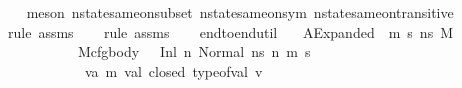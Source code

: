 \begin{isabellebody}
\ \ \isamarkupfalse%
\ {\isacharparenleft}{\kern0pt}meson\ nstate{\isacharunderscore}{\kern0pt}same{\isacharunderscore}{\kern0pt}on{\isacharunderscore}{\kern0pt}subset\ nstate{\isacharunderscore}{\kern0pt}same{\isacharunderscore}{\kern0pt}on{\isacharunderscore}{\kern0pt}sym\ nstate{\isacharunderscore}{\kern0pt}same{\isacharunderscore}{\kern0pt}on{\isacharunderscore}{\kern0pt}transitive{\isacharparenright}{\kern0pt}\isanewline
\ \ \ \isamarkupfalse%
\ {\isacharparenleft}{\kern0pt}rule\ assms{\isacharparenleft}{\kern0pt}{}{\isacharparenright}{\kern0pt}{\isacharparenright}{\kern0pt}\isanewline
\ \ \isamarkupfalse%
\ {\isacharparenleft}{\kern0pt}rule\ assms{\isacharparenleft}{\kern0pt}{}{\isacharparenright}{\kern0pt}{\isacharparenright}{\kern0pt}\isanewline
\ \ \isamarkupfalse%
%
\endisatagproof
{\isafoldproof}%
%
\isadelimproof
%
\endisadelimproof
%
\isadelimdocument
%
\endisadelimdocument
%
\isatagdocument
%
\isamarkuptrue%
%
\endisatagdocument
{\isafolddocument}%
%
\isadelimdocument
%
\endisadelimdocument
{}\isamarkupfalse%
\ end{\isacharunderscore}{\kern0pt}to{\isacharunderscore}{\kern0pt}end{\isacharunderscore}{\kern0pt}util{\isacharcolon}{\kern0pt}\isanewline
\ \ \ AExpanded{\isacharcolon}{\kern0pt}{\isachardoublequoteopen}{\isasymAnd}\ {\isasymGamma}\ m{\isacharprime}{\kern0pt}\ s{\isacharprime}{\kern0pt}\ ns\ M{\isachardot}{\kern0pt}\isanewline
\ \ \ \ \ \ \ \ \ \ \ M{\isacharcomma}{\kern0pt}{\isasymLambda}{\isacharcomma}{\kern0pt}{\isasymGamma}{\isacharcomma}{\kern0pt}{\isacharbrackleft}{\kern0pt}{\isacharbrackright}{\kern0pt}{\isacharcomma}{\kern0pt}cfg{\isacharunderscore}{\kern0pt}body\ \ {\isasymturnstile}\ {\isacharparenleft}{\kern0pt}Inl\ n{\isacharcomma}{\kern0pt}\ Normal\ ns{\isacharparenright}{\kern0pt}\ {\isacharminus}{\kern0pt}n{\isasymrightarrow}{\isacharasterisk}{\kern0pt}\ {\isacharparenleft}{\kern0pt}m{\isacharprime}{\kern0pt}{\isacharcomma}{\kern0pt}\ s{\isacharprime}{\kern0pt}{\isacharparenright}{\kern0pt}\ {\isasymLongrightarrow}\isanewline
\ \ \ \ \ \ \ \ \ \ \ {\isacharparenleft}{\kern0pt}{\isasymAnd}\ v{\isacharcolon}{\kern0pt}{\isacharcolon}{\kern0pt}{\isacharparenleft}{\kern0pt}{\isacharprime}{\kern0pt}a{\isacharcomma}{\kern0pt}\ {\isacharprime}{\kern0pt}m{\isacharparenright}{\kern0pt}\ val{\isachardot}{\kern0pt}\ {\isacharparenleft}{\kern0pt}closed\ {\isacharparenleft}{\kern0pt}type{\isacharunderscore}{\kern0pt}of{\isacharunderscore}{\kern0pt}val\ v{\isacharparenright}{\kern0pt}{\isacharparenright}{\kern0pt}{\isacharparenright}{\kern0pt}\ {\isasymLongrightarrow}\isanewline

\end{isabellebody}
